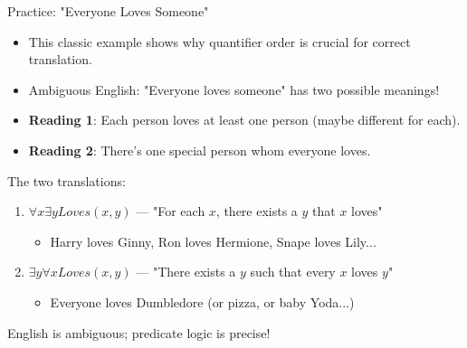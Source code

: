 \documentclass{beamer}
\begin{document}
	\begin{frame}{Practice: "Everyone Loves Someone"}
		\begin{itemize}
			\item This classic example shows why quantifier order is crucial for correct translation.
			\item Ambiguous English: "Everyone loves someone" has two possible meanings!
			\item \textbf{Reading 1}: Each person loves at least one person (maybe different for each).
			\item \textbf{Reading 2}: There's one special person whom everyone loves.
		\end{itemize}
		
		\begin{example}
			The two translations:
			\begin{enumerate}
				\item $\forall x \exists y Loves(x,y)$ — "For each $x$, there exists a $y$ that $x$ loves"
				\begin{itemize}
					\item Harry loves Ginny, Ron loves Hermione, Snape loves Lily...
				\end{itemize}
				\item $\exists y \forall x Loves(x,y)$ — "There exists a $y$ such that every $x$ loves $y$"
				\begin{itemize}
					\item Everyone loves Dumbledore (or pizza, or baby Yoda...)
				\end{itemize}
			\end{enumerate}
			English is ambiguous; predicate logic is precise!
		\end{example}
	\end{frame}
	
\end{document}
